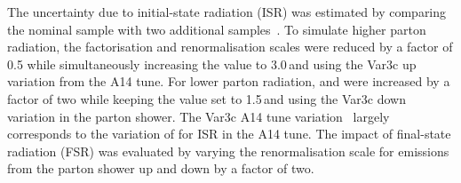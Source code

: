 The uncertainty due to initial-state radiation (ISR) was estimated by
comparing the nominal \ttbar sample with two additional
samples~\cite{ATL-PHYS-PUB-2017-007}.  To simulate higher parton
radiation, the factorisation and renormalisation scales were reduced by
a factor of 0.5 while simultaneously increasing the \hdamp value to
3.0\,\mtop and using the Var3c up variation from the A14 tune. For
lower parton radiation, \muR and \muF were increased by a factor of two
while keeping the \hdamp value set to 1.5\,\mtop and using the Var3c down
variation in the parton shower.  The Var3c A14 tune
variation~\cite{ATL-PHYS-PUB-2014-021} largely corresponds to the variation of
\alphas for ISR in the A14 tune. 
The impact of final-state radiation (FSR) was evaluated by
varying the renormalisation scale for emissions from the
parton shower up and down by a factor of two.
